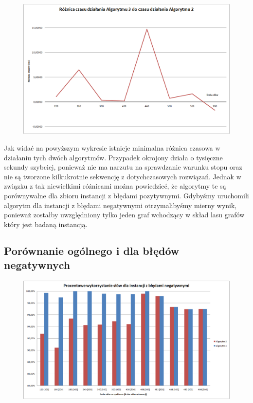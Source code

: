 \documentclass[a4paper,10pt]{article}
\begin{document}
\begin{figure}[h]
  \footnotesize\centering
  \includegraphics[width=\textwidth,keepaspectratio]{timeDiff_general_vs_positive.png}
\end{figure}

Jak widać na powyższym wykresie istnieje minimalna różnica czasowa w działaniu tych dwóch algorytmów. Przypadek okrojony działa o tysięczne sekundy szybciej, ponieważ nie ma narzutu na sprawdzanie warunku stopu oraz nie są tworzone kilkukrotnie sekwencję z dotychczasowych rozwiązań. Jednak w związku z tak niewielkimi różnicami można powiedzieć, że algorytmy te są porównywalne dla zbioru instancji z błędami pozytywnymi.
Gdybyśmy uruchomili algorytm dla instancji z błędami negatywnymi otrzymalibyśmy mierny wynik, ponieważ zostałby uwzględniony tylko jeden graf wchodzący w skład lasu grafów który jest badaną instancją.

\subsection{Porównanie ogólnego i dla błędów negatywnych}

\begin{figure}[h]
  \footnotesize\centering
  \includegraphics[width=\textwidth,keepaspectratio]{percentageUsedWords_general_vs_negative.png}
\end{figure}
\end{document}
